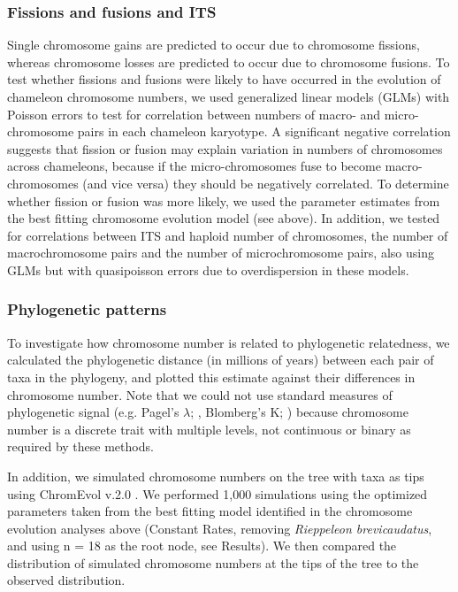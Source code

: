 \documentclass[a4paper, 12pt]{article}
\begin{document}
\subsubsection{Fissions and fusions and ITS}
Single chromosome gains are predicted to occur due to chromosome fissions, whereas chromosome losses are predicted to occur due to chromosome fusions. 
To test whether fissions and fusions were likely to have occurred in the evolution of chameleon chromosome numbers, we used generalized linear models (GLMs) with Poisson errors to test for correlation between numbers of macro- and micro-chromosome pairs in each chameleon karyotype. 
A significant negative correlation suggests that fission or fusion may explain variation in numbers of chromosomes across chameleons, because if the micro-chromosomes fuse to become macro-chromosomes (and vice versa) they should be negatively correlated.
To determine whether fission or fusion was more likely, we used the parameter estimates from the best fitting chromosome evolution model (see above). 
In addition, we tested for correlations between ITS and haploid number of chromosomes, the number of macrochromosome pairs and the number of microchromosome pairs, also using GLMs but with quasipoisson errors due to overdispersion in these models.

\subsubsection{Phylogenetic patterns}
To investigate how chromosome number is related to phylogenetic relatedness, we calculated the phylogenetic distance (in millions of years) between each pair of taxa in the phylogeny, and plotted this estimate against their differences in chromosome number. 
Note that we could not use standard measures of phylogenetic signal (e.g. Pagel's $\lambda$; \citealt{pagel1999inferring}, Blomberg's K; \citealt{blomberg2003testing}) because chromosome number is a discrete trait with multiple levels, not continuous or binary as required by these methods. 

In addition, we simulated chromosome numbers on the tree with taxa as tips using ChromEvol v.2.0 \citep{glick2014chromevol,mayrose2010probabilistic}. 
We performed 1,000 simulations using the optimized parameters taken from the best fitting model identified in the chromosome evolution analyses above (Constant Rates, removing \textit{Rieppeleon brevicaudatus}, and using n = 18 as the root node, see Results). 
We then compared the distribution of simulated chromosome numbers at the tips of the tree to the observed distribution. 
\end{document}
